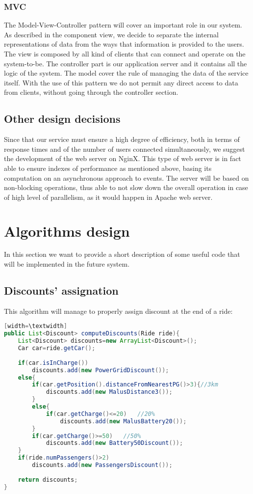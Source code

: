 \documentclass[10pt, a4paper,titlepage]{article}
\begin{document}
\subsubsection*{MVC}
The Model-View-Controller pattern will cover an important role in our system. As described in the component view, we decide to separate the internal representations of data from the ways that information is provided to the users. 
The view is composed by all kind of clients that can connect and operate on the system-to-be.
The controller part is our application server and it contains all the logic of the system.
The model cover the rule of managing the data of the service itself.
With the use of this pattern we do not permit any direct access to data from clients, without going through the controller section.
\subsection{Other design decisions}
Since that our service must ensure a high degree of efficiency, both in terms of response times and of the number of users connected simultaneously, we suggest the development of the web server on NginX.
This type of web server is in fact able to ensure indexes of performance as mentioned above, basing its computation on an asynchronous approach to events.
The server will be based on non-blocking operations, thus able to not slow down the overall operation in case of high level of parallelism, as it would happen in Apache web server.
\section{Algorithms design}
In this section we want to provide a short description of some useful code that will be implemented in the future system.
\subsection*{Discounts' assignation}
This algorithm will manage to properly assign discount at the end of a ride:
\begin{lstlisting}[language=Java][width=\textwidth]
public List<Discount> computeDiscounts(Ride ride){
    List<Discount> discounts=new ArrayList<Discount>();
    Car car=ride.getCar();
    
    if(car.isInCharge())
        discounts.add(new PowerGridDiscount());
    else{
        if(car.getPosition().distanceFromNearestPG()>3){//3km
            discounts.add(new MalusDistance3());
        }
        else{
            if(car.getCharge()<=20)   //20%
                discounts.add(new MalusBattery20());
        }
        if(car.getCharge()>=50)   //50%
            discounts.add(new Battery50Discount());
    }
    if(ride.numPassengers()>2)
        discounts.add(new PassengersDiscount());
        
    return discounts;
}
\end{lstlisting}
\bigskip
\bigskip
{}
\end{document}
